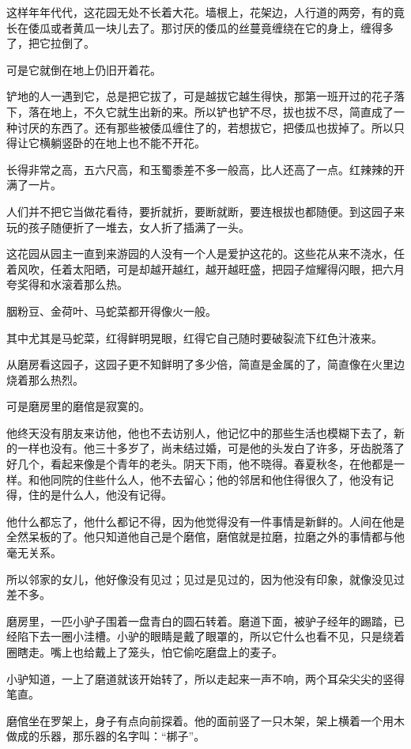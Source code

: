 \par 这样年年代代，这花园无处不长着大花。墙根上，花架边，人行道的两旁，有的竟长在倭瓜或者黄瓜一块儿去了。那讨厌的倭瓜的丝蔓竟缠绕在它的身上，缠得多了，把它拉倒了。
\par 可是它就倒在地上仍旧开着花。
\par 铲地的人一遇到它，总是把它拔了，可是越拔它越生得快，那第一班开过的花子落下，落在地上，不久它就生出新的来。所以铲也铲不尽，拔也拔不尽，简直成了一种讨厌的东西了。还有那些被倭瓜缠住了的，若想拔它，把倭瓜也拔掉了。所以只得让它横躺竖卧的在地上也不能不开花。
\par 长得非常之高，五六尺高，和玉蜀黍差不多一般高，比人还高了一点。红辣辣的开满了一片。
\par 人们并不把它当做花看待，要折就折，要断就断，要连根拔也都随便。到这园子来玩的孩子随便折了一堆去，女人折了插满了一头。
\par 这花园从园主一直到来游园的人没有一个人是爱护这花的。这些花从来不浇水，任着风吹，任着太阳晒，可是却越开越红，越开越旺盛，把园子煊耀得闪眼，把六月夸奖得和水滚着那么热。
\par 胭粉豆、金荷叶、马蛇菜都开得像火一般。
\par 其中尤其是马蛇菜，红得鲜明晃眼，红得它自己随时要破裂流下红色汁液来。
\par 从磨房看这园子，这园子更不知鲜明了多少倍，简直是金属的了，简直像在火里边烧着那么热烈。
\par 可是磨房里的磨倌是寂寞的。
\par 他终天没有朋友来访他，他也不去访别人，他记忆中的那些生活也模糊下去了，新的一样也没有。他三十多岁了，尚未结过婚，可是他的头发白了许多，牙齿脱落了好几个，看起来像是个青年的老头。阴天下雨，他不晓得。春夏秋冬，在他都是一样。和他同院的住些什么人，他不去留心；他的邻居和他住得很久了，他没有记得，住的是什么人，他没有记得。
\par 他什么都忘了，他什么都记不得，因为他觉得没有一件事情是新鲜的。人间在他是全然呆板的了。他只知道他自己是个磨倌，磨倌就是拉磨，拉磨之外的事情都与他毫无关系。
\par 所以邻家的女儿，他好像没有见过；见过是见过的，因为他没有印象，就像没见过差不多。
\par 磨房里，一匹小驴子围着一盘青白的圆石转着。磨道下面，被驴子经年的踢踏，已经陷下去一圈小洼槽。小驴的眼睛是戴了眼罩的，所以它什么也看不见，只是绕着圈瞎走。嘴上也给戴上了笼头，怕它偷吃磨盘上的麦子。
\par 小驴知道，一上了磨道就该开始转了，所以走起来一声不响，两个耳朵尖尖的竖得笔直。
\par 磨倌坐在罗架上，身子有点向前探着。他的面前竖了一只木架，架上横着一个用木做成的乐器，那乐器的名字叫：“梆子”。
